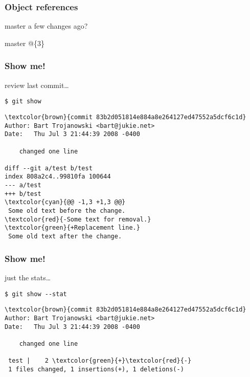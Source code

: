 \documentclass[english]{beamer}
\newcommand{\CMD}[1]{%
\texttt{\textcolor{code-green}{#1}}%
}
\newcommand{\faint}[1]{%
\textcolor{code-gray}{#1}%
}
\begin{document}
\begin{frame}
\frametitle{Object references}

master a few changes ago?

\vspace{.1\textheight}
\begin{center}
        \faint{master}@\{3\}
\end{center}

\end{frame}

\begin{frame}[fragile]
\frametitle{Show me!}

review last commit\ldots
\vspace{\baselineskip}

\CMD{\$ git show}
{\small
\begin{Verbatim}[commandchars=\\\{\}]
\textcolor{brown}{commit 83b2d051814e884a8e264127ed47552a5dcf6c1d}
Author: Bart Trojanowski <bart@jukie.net>
Date:   Thu Jul 3 21:44:39 2008 -0400

    changed one line

diff --git a/test b/test
index 808a2c4..99810fa 100644
--- a/test
+++ b/test
\textcolor{cyan}{@@ -1,3 +1,3 @@}
 Some old text before the change.
\textcolor{red}{-Some text for removal.}
\textcolor{green}{+Replacement line.}
 Some old text after the change.
\end{Verbatim}
}
\vspace{\textheight}
\end{frame}

\begin{frame}[fragile]
\frametitle{Show me!}

just the stats\ldots
\vspace{\baselineskip}

\CMD{\$ git show {-}-stat}
{\small
\begin{Verbatim}[commandchars=\\\{\}]
\textcolor{brown}{commit 83b2d051814e884a8e264127ed47552a5dcf6c1d}
Author: Bart Trojanowski <bart@jukie.net>
Date:   Thu Jul 3 21:44:39 2008 -0400

    changed one line

 test |    2 \textcolor{green}{+}\textcolor{red}{-}
 1 files changed, 1 insertions(+), 1 deletions(-)
\end{Verbatim}
}
\vspace{\textheight}
\end{frame}
\end{document}
